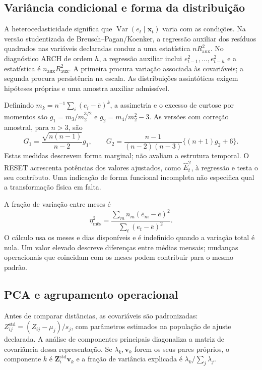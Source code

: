 \subsection{Variância condicional e forma da distribuição}
\label{sec:mat-variancia-forma}
A heterocedasticidade significa que $\operatorname{Var}(e_t\mid\boldsymbol x_t)$ varia com as condições. Na versão studentizada de
Breusch--Pagan/Koenker, a
regressão auxiliar dos resíduos quadrados nas variáveis declaradas conduz a uma estatística $nR_{\mathrm{aux}}^2$. No diagnóstico ARCH de ordem $h$, a regressão auxiliar inclui $e_{t-1}^2,\ldots,e_{t-h}^2$ e a estatística é $n_{\mathrm{aux}}R_{\mathrm{aux}}^2$. A primeira procura variação associada às covariáveis; a segunda procura persistência na escala. As distribuições assintóticas exigem hipóteses próprias e uma amostra auxiliar admissível.

Definindo $m_k=n^{-1}\sum_i(e_i-\bar e)^k$, a assimetria e o excesso de curtose por momentos são $g_1=m_3/m_2^{3/2}$ e $g_2=m_4/m_2^2-3$. As versões com correção amostral, para $n>3$, são
\begin{equation}
G_1=\frac{\sqrt{n(n-1)}}{n-2}g_1,
\qquad
G_2=\frac{n-1}{(n-2)(n-3)}\{(n+1)g_2+6\}.
\label{eq:mat-forma}
\end{equation}
Estas medidas descrevem forma marginal; não avaliam a estrutura temporal. O RESET acrescenta potências dos valores ajustados, como $\widehat E_t^2$, à regressão e testa o seu contributo. Uma indicação de forma funcional incompleta não especifica qual a transformação física em falta.

A fração de variação entre meses é
\begin{equation}
\eta^2_{\mathrm{mês}}=
\frac{\sum_m n_m(\bar e_m-\bar e)^2}{\sum_t(e_t-\bar e)^2}.
\label{eq:mat-eta}
\end{equation}
O cálculo usa os meses e dias disponíveis e é indefinido quando a variação total é nula. Um valor elevado descreve diferenças entre médias mensais; mudanças operacionais que coincidam com os meses podem contribuir para o mesmo padrão.

\subsection{PCA e agrupamento operacional}
\label{sec:mat-pca-clusters}
Antes de comparar distâncias, as covariáveis são padronizadas: $Z_{ij}^{\mathrm{std}}=(Z_{ij}-\mu_j)/s_j$, com parâmetros estimados na população de ajuste declarada. A análise de componentes principais diagonaliza a matriz de covariância dessa representação. Se $\lambda_k,\boldsymbol v_k$ forem os seus pares próprios, o componente $k$ é $\boldsymbol Z_i^{\mathrm{std}}\boldsymbol v_k$ e a fração de variância explicada é $\lambda_k/\sum_j\lambda_j$.

